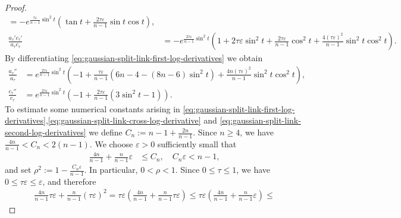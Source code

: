 \documentclass[11pt,reqno]{amsart}
\numberwithin{equation}{section}
\theoremstyle{definition}
\theoremstyle{remark}
\newcommand{\ta}{\tau}
\newcommand{\0}{\emptyset}
\newcommand{\veps}{\varepsilon}
\begin{document}
\begin{proof}
\begin{align}
        =
        -
        e^{\frac{\ta\veps}{n-1}\sin^2t}
        \left(
        \tan t
        +
        \frac{2\ta\veps}{n-1}\sin t\cos t
        \right), \label{eq:gaussian-split-link-first-log-derivatives}\\
        \frac{a_\ta'c_\ta'}{a_\ta c_\ta}
        &=
        -
        e^{\frac{2\ta\veps}{n-1}\sin^2t}
        \left(
        1
        +
        2\ta\veps\sin^2t
        +
        \frac{2\ta\veps}{n-1}\cos^2t
        +
        \frac{4(\ta\veps)^2}{n-1}
        \sin^2t\cos^2t
        \right).\label{eq:gaussian-split-link-cross-log-derivative}
\end{align}
By differentiating \eqref{eq:gaussian-split-link-first-log-derivatives} we obtain
\begin{align}\label{eq:gaussian-split-link-second-log-derivatives}
        \frac{a_\ta''}{a_\ta}
        &=
        e^{\frac{2\ta\veps}{n-1}\sin^2t}
        \left(
        -1
        +
        \frac{\ta\veps}{n-1}
        \left(
        6n-4-(8n-6)\sin^2t
        \right)
        +
        \frac{4n(\ta\veps)^2}{n-1}
        \sin^2t\cos^2t
        \right),\\
        \frac{c_\ta''}{c_\ta}
        &=
        e^{\frac{2\ta\veps}{n-1}\sin^2t}
        \left(
        -1
        +
        \frac{2\ta\veps}{n-1}
        \left(
        3\sin^2t-1
        \right)
        \right).
\end{align}
To estimate some numerical constants arising in \eqref{eq:gaussian-split-link-first-log-derivatives},\eqref{eq:gaussian-split-link-cross-log-derivative} and \eqref{eq:gaussian-split-link-second-log-derivatives} we define $C_n:=n-1+\frac{2n}{n-1}.$ Since $n\geq4$, we have $\frac{4n}{n-1}<C_n<2(n-1).$ We choose $\veps>0$ sufficiently small that
\begin{align}\label{eq:gaussian-split-epsilon-first}
        \frac{4n}{n-1}
        +
        \frac{n}{n-1}\veps
        &\leq
        C_n,
        \quad
        C_n\veps<n-1,
\end{align}
and set $\rho^2:= 1-\frac{C_n\veps}{n-1}.$  In particular, $0<\rho<1$. Since $0\leq\ta\leq1$, we have $0\leq\ta\veps\leq\veps$, and therefore
\begin{align}\label{eq:gaussian-split-Ricci-error-bound}
        \frac{4n}{n-1}\ta\veps
        +
        \frac{n}{n-1}(\ta\veps)^2
        =
        \ta\veps
        \left(
        \frac{4n}{n-1}
        +
        \frac{n}{n-1}\ta\veps
        \right)\leq
        \ta\veps
        \left(
        \frac{4n}{n-1}
        +
        \frac{n}{n-1}\veps
        \right)\leq

\end{align}
\end{proof}
\end{document}
